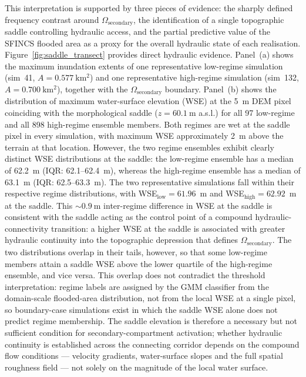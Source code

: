 \documentclass[a4paper,fleqn]{cas-sc}
\newcommand{\sfincs}{\textsc{SFINCS}}
\begin{document}
This interpretation is supported by three pieces of evidence: the sharply defined frequency contrast around $\Omega_{\mathrm{secondary}}$, the identification of a single topographic saddle controlling hydraulic access, and the partial predictive value of the \sfincs{} flooded area as a proxy for the overall hydraulic state of each realisation. Figure~\ref{fig:saddle_transect} provides direct hydraulic evidence. Panel~(a) shows the maximum inundation extents of one representative low-regime simulation (sim~41, $A = 0.577~\mathrm{km^2}$) and one representative high-regime simulation (sim~132, $A = 0.700~\mathrm{km^2}$), together with the $\Omega_{\mathrm{secondary}}$ boundary. Panel~(b) shows the distribution of maximum water-surface elevation (WSE) at the 5~m DEM pixel coinciding with the morphological saddle ($z = 60.1~\mathrm{m}$ a.s.l.) for all 97 low-regime and all 898 high-regime ensemble members. Both regimes are wet at the saddle pixel in every simulation, with maximum WSE approximately 2~m above the terrain at that location. However, the two regime ensembles exhibit clearly distinct WSE distributions at the saddle: the low-regime ensemble has a median of 62.2~m (IQR: 62.1--62.4~m), whereas the high-regime ensemble has a median of 63.1~m (IQR: 62.5--63.3~m). The two representative simulations fall within their respective regime distributions, with WSE$_{\mathrm{low}}=61.96$~m and WSE$_{\mathrm{high}}=62.92$~m at the saddle. This ${\sim}0.9~\mathrm{m}$ inter-regime difference in WSE at the saddle is consistent with the saddle acting as the control point of a compound hydraulic-connectivity transition: a higher WSE at the saddle is associated with greater hydraulic continuity into the topographic depression that defines $\Omega_{\mathrm{secondary}}$. The two distributions overlap in their tails, however, so that some low-regime members attain a saddle WSE above the lower quartile of the high-regime ensemble, and vice versa. This overlap does not contradict the threshold interpretation: regime labels are assigned by the GMM classifier from the domain-scale flooded-area distribution, not from the local WSE at a single pixel, so boundary-case simulations exist in which the saddle WSE alone does not predict regime membership. The saddle elevation is therefore a necessary but not sufficient condition for secondary-compartment activation; whether hydraulic continuity is established across the connecting corridor depends on the compound flow conditions — velocity gradients, water-surface slopes and the full spatial roughness field — not solely on the magnitude of the local water surface.
\end{document}
